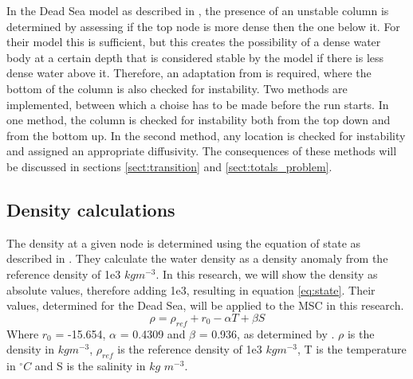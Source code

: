 \documentclass[twocolumn]{article}
\begin{document}
In the Dead Sea model as described in \cite{Heiden2017Application}, the presence of an unstable column is determined by assessing if the top node is more dense then the one below it. For their model this is sufficient, but this creates the possibility of a dense water body at a certain depth that is considered stable by the model if there is less dense water above it. Therefore, an adaptation from \cite{Heiden2017Application} is required, where the bottom of the column is also checked for instability. Two methods are implemented, between which a choise has to be made before the run starts. In one method, the column is checked for instability both from the top down and from the bottom up. In the second method, any location is checked for instability and assigned an appropriate diffusivity. The consequences of these methods will be discussed in sections \ref{sect:transition} and \ref{sect:totals_problem}.

\subsection{Density calculations}
The density at a given node is determined using the equation of state as described in \cite{ivanov2002model}. They calculate the water density as a density anomaly from the reference density of 1e3 $kg m^{-3}$. In this research, we will show the density as absolute values, therefore adding 1e3, resulting in equation \ref{eq:state}. Their values, determined for the Dead Sea, will be applied to the MSC in this research.
\begin{equation}
    \rho = \rho_{ref} + r_0 - \alpha T + \beta S
\label{eq:state}
\end{equation}
Where $r_0$ = -15.654, $\alpha$ = 0.4309 and $\beta$ = 0.936, as determined by \cite{ivanov2002model}. $\rho$ is the density in $kg m^{-3}$, $\rho_{ref}$ is the reference density of 1e3 $kg m^{-3}$, T is the temperature in $^{\circ} C$ and S is the salinity in $kg$ $m^{-3}$. 





\end{document}
